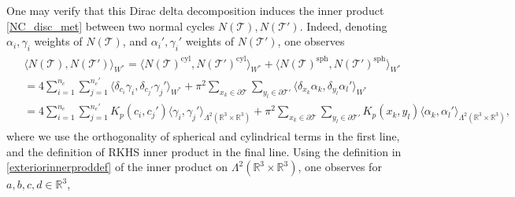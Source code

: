 \documentclass[sn-mathphys-num]{sn-jnl}%
\theoremstyle{thmstyleone}%
\theoremstyle{thmstyletwo}%
\theoremstyle{thmstylethree}%
\numberwithin{remark}{section}
\numberwithin{definition}{section}
\numberwithin{equation}{section}
\numberwithin{theorem}{section}
\newcommand{\R}{\ensuremath{\mathbb{R}}}%
\begin{document}
One may verify that this Dirac delta decomposition induces the inner product \cref{NC_disc_met} between two normal cycles $N(\mathcal{T}),N(\mathcal{T}')$. Indeed, denoting $\alpha_{i},\gamma_{i}$ weights of $ N(\mathcal{T})$, and $\alpha_{i}',\gamma_{i}'$ weights of $N(\mathcal{T}')$, one observes
\begin{gather}\begin{split}
   & \langle N(\mathcal{T}),N(\mathcal{T}') \rangle_{W^{*}} = \langle N(\mathcal{T})^{\mathrm{cyl}},N(\mathcal{T}')^{\mathrm{cyl}}\rangle_{W^{*}} + \langle N(\mathcal{T})^{\mathrm{sph}} ,N(\mathcal{T}')^{\mathrm{sph}}\rangle_{W^{*}} \\
   &= 4\sum_{i=1}^{n_{e}}\sum_{j=1}^{n_{e}'}{\langle \delta_{c_{i}}\gamma_{i},\delta_{c_{j}'}\gamma_{j}' \rangle_{W^{*}}} + \pi^2\sum_{x_{k} \in \partial\mathcal{T }}\sum_{y_{l} \in \partial\mathcal{T }'}{\langle \delta_{x_{k}}\alpha_{k},\delta_{y_{l}}\alpha_{l}' \rangle_{W^{*}} }\\
    &= 4 \sum_{i=1}^{n_{e}}\sum_{j=1}^{n_{e}'}{K_{p}(c_{i},c_{j}')\langle\gamma_{i},\gamma_{j}' \rangle_{\Lambda^{2}(\R^{3}\times \R^{3})}} + \pi^2\sum_{x_{k} \in \partial\mathcal{T }}\sum_{y_{l} \in \partial\mathcal{T }'}{K_p(x_{k},y_{l})\langle \alpha_{k},\alpha_{l}' \rangle_{\Lambda^{2}(\R^{3}\times \R^{3})} },
\end{split}\label{FINALINE}\end{gather}
where we use the orthogonality of spherical and cylindrical terms \cite{NCpaper} in the first line, and the definition of RKHS inner product in the final line. Using the definition in \cref{exteriorinnerproddef} of the inner product on $\Lambda^{2}(\R^{3}\times \R^{3})$, one observes for $a,b,c,d \in \R^{3}$,
\end{document}
